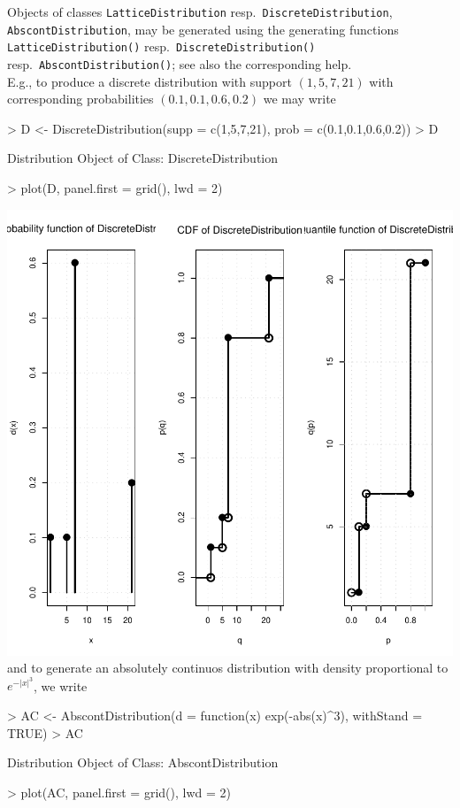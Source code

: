 \documentclass[10pt]{article}
\let\code\lstinline
\begin{document}
Objects of classes \code{LatticeDistribution} resp.\ 
\code{DiscreteDistribution}, 
\code{AbscontDistribution},  may be generated using the generating functions
\code{LatticeDistribution()} resp.\ \code{DiscreteDistribution()}
resp.\ \code{AbscontDistribution()}; see also
the corresponding help.\\

E.g., to produce a discrete distribution with
support $(1,5,7,21)$ with corresponding probabilities $(0.1,0.1,0.6,0.2)$
we may write
\begin{Schunk}
\begin{Sinput}
> D <- DiscreteDistribution(supp = c(1,5,7,21), prob = c(0.1,0.1,0.6,0.2))
> D
\end{Sinput}
\begin{Soutput}
Distribution Object of Class: DiscreteDistribution
\end{Soutput}
\begin{Sinput}
> plot(D, panel.first = grid(), lwd = 2)
\end{Sinput}
\end{Schunk}
\includegraphics{newDistributions-DiscrDist}
%
\newline
and to generate an absolutely continuos distribution with density proportional
to $e^{-|x|^3}$, we write
\begin{Schunk}
\begin{Sinput}
> AC <- AbscontDistribution(d = function(x) exp(-abs(x)^3), withStand = TRUE)
> AC
\end{Sinput}
\begin{Soutput}
Distribution Object of Class: AbscontDistribution
\end{Soutput}
\begin{Sinput}
> plot(AC, panel.first = grid(), lwd = 2)
\end{Sinput}
\end{Schunk}
\end{document}
